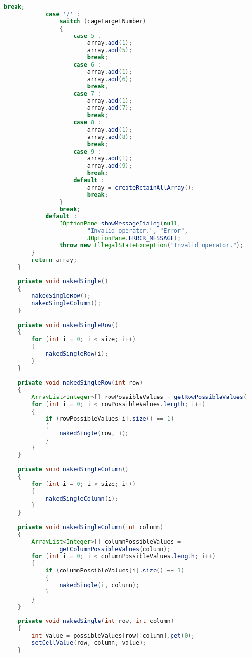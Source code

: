 \begin{lstlisting}[language=Java,basicstyle=\tiny,caption=SolverRuleBased.java]
                break;
            case '/' :
                switch (cageTargetNumber)
                {
                    case 5 :
                        array.add(1);
                        array.add(5);
                        break;
                    case 6 :
                        array.add(1);
                        array.add(6);
                        break;
                    case 7 :
                        array.add(1);
                        array.add(7);
                        break;
                    case 8 :
                        array.add(1);
                        array.add(8);
                        break;
                    case 9 :
                        array.add(1);
                        array.add(9);
                        break;
                    default :
                        array = createRetainAllArray();
                        break;
                }
                break;
            default :
                JOptionPane.showMessageDialog(null, 
                        "Invalid operator.", "Error", 
                        JOptionPane.ERROR_MESSAGE);
                throw new IllegalStateException("Invalid operator.");
        }
        return array;
    }
    
    private void nakedSingle()
    {
        nakedSingleRow();
        nakedSingleColumn();
    }
    
    private void nakedSingleRow()
    {
        for (int i = 0; i < size; i++)
        {
            nakedSingleRow(i);
        }
    }
    
    private void nakedSingleRow(int row)
    {
        ArrayList<Integer>[] rowPossibleValues = getRowPossibleValues(row);
        for (int i = 0; i < rowPossibleValues.length; i++)
        {
            if (rowPossibleValues[i].size() == 1)
            {
                nakedSingle(row, i);
            }
        }
    }
    
    private void nakedSingleColumn()
    {
        for (int i = 0; i < size; i++)
        {
            nakedSingleColumn(i);
        }
    }
    
    private void nakedSingleColumn(int column)
    {
        ArrayList<Integer>[] columnPossibleValues = 
                getColumnPossibleValues(column);
        for (int i = 0; i < columnPossibleValues.length; i++)
        {
            if (columnPossibleValues[i].size() == 1)
            {
                nakedSingle(i, column);
            }
        }
    }
    
    private void nakedSingle(int row, int column)
    {
        int value = possibleValues[row][column].get(0);
        setCellValue(row, column, value);
    }
    

\end{lstlisting}
